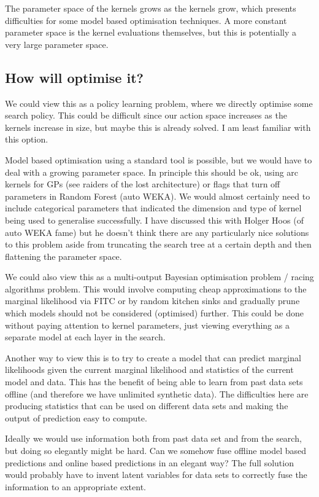 \documentclass[twoside,11pt]{article}
\begin{document}
The parameter space of the kernels grows as the kernels grow, which presents difficulties for some model based optimisation techniques.
A more constant parameter space is the kernel evaluations themselves, but this is potentially a very large parameter space.

\subsection{How will optimise it?}

We could view this as a policy learning problem, where we directly optimise some search policy.
This could be difficult since our action space increases as the kernels increase in size, but maybe this is already solved.
I am least familiar with this option.

Model based optimisation using a standard tool is possible, but we would have to deal with a growing parameter space.
In principle this should be ok, using arc kernels for GPs (see raiders of the lost architecture) or flags that turn off parameters in Random Forest (\eg auto WEKA).
We would almost certainly need to include categorical parameters that indicated the dimension and type of kernel being used to generalise successfully.
I have discussed this with Holger Hoos (of auto WEKA fame) but he doesn't think there are any particularly nice solutions to this problem aside from truncating the search tree at a certain depth and then flattening the parameter space.

We could also view this as a multi-output Bayesian optimisation problem / racing algorithms problem.
This would involve computing cheap approximations to the marginal likelihood \eg via FITC or by random kitchen sinks and gradually prune which models should not be considered (optimised) further.
This could be done without paying attention to kernel parameters, just viewing everything as a separate model at each layer in the search.

Another way to view this is to try to create a model that can predict marginal likelihoods given the current marginal likelihood and statistics of the current model and data.
This has the benefit of being able to learn from past data sets offline (and therefore we have unlimited synthetic data).
The difficulties here are producing statistics that can be used on different data sets and making the output of prediction easy to compute.

Ideally we would use information both from past data set and from the search, but doing so elegantly might be hard.
Can we somehow fuse offline model based predictions and online based predictions in an elegant way?
The full solution would probably have to invent latent variables for data sets to correctly fuse the information to an appropriate extent.
\end{document}
